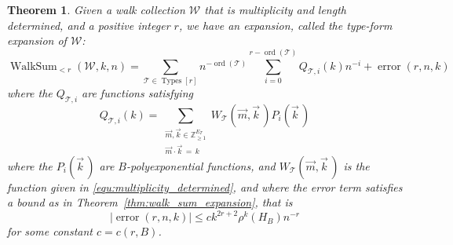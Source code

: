 \documentclass{memo-l}
\theoremstyle{plain}
\theoremstyle{definition}
\numberwithin{section}{chapter}
\numberwithin{equation}{chapter}
\DeclareMathOperator{\ord}{ord}
\DeclareMathOperator{\WalkSum}{WalkSum}
\DeclareMathOperator{\error}{error}
\DeclareMathOperator{\Types}{Types}
\theoremstyle{plain}
\newtheorem{thm}[theorem]{Theorem}
\theoremstyle{definition}
\newcommand\ZZ{\mathbb{Z}}
\newcommand\cT{\mathcal{T}}
\newcommand\cW{\mathcal{W}}
\begin{document}
\begin{thm}\label{thm:type_form_expansion} Given a walk collection \( \cW
\) that is multiplicity and length determined, and a positive integer \( r
\), we have an expansion, called the \emph{type-form expansion of \( \cW
\)}: \[ \WalkSum_{<r}(\cW,k,n) = \sum_{\cT \in \Types[r]} n^{-\ord(\cT)}
\sum_{i=0}^{r-\ord(\cT)} Q_{\cT,i}(k) n^{-i} + \error(r, n, k) \] where the
\( Q_{\cT,i} \) are functions satisfying \[ Q_{\cT,i}(k) =
\sum_{\substack{\vec m, \vec k \in \ZZ_{\geq 1}^{E_T} \\ \vec m \cdot \vec
k \,=\, k}} W_\cT(\vec m, \vec k\,) P_i(\vec k\,) \] where the \( P_i( \vec
k\,) \) are \(B\)-polyexponential functions, and \( W_\cT(\vec m, \vec k\,)
\) is the function given in \eqref{equ:multiplicity_determined},
and where
the error term satisfies a bound as in 
Theorem~\ref{thm:walk_sum_expansion}, that is 
\[ | \error(r,n,k) | \leq ck^{2r+2}
\rho^k(H_B) n^{-r} \] 
for some constant $c=c(r,B)$.
\end{thm} 
\end{document}
